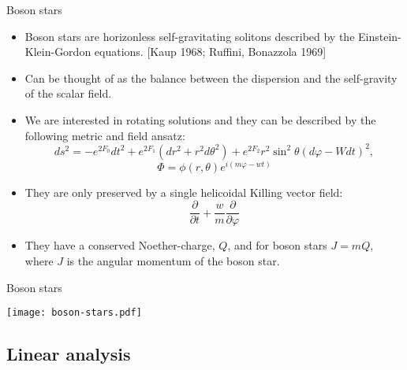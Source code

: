 \documentclass[xcolor=dvipsnames]{beamer}
\begin{document}
\begin{frame}{Boson stars}
  \begin{itemize}[<+->]
    \item Boson stars are horizonless self-gravitating solitons described by the Einstein-Klein-Gordon equations. \tiny{[Kaup 1968; Ruffini, Bonazzola 1969]}
    \item Can be thought of as the balance between the dispersion and the self-gravity of the scalar field.
    \item We are interested in rotating solutions and they can be described by the following metric and field ansatz:
      \begin{equation*}
        ds^2 = -e^{2F_0}dt^2 + e^{2F_1}\left( dr^2 + r^2d\theta^2 \right) + e^{2F_2}r^2\sin^2\theta\left( d\varphi-Wdt \right)^2, 
      \end{equation*}
      \begin{equation*}
        \Phi = \phi(r,\theta)e^{i\left( m\varphi-wt \right)}
      \end{equation*}
    \item They are only preserved by a single helicoidal Killing vector field:
      \begin{equation*}
        \frac{\partial}{\partial t} + \frac{w}{m}\frac{\partial}{\partial \varphi}
      \end{equation*}
    \item They have a conserved Noether-charge, $Q$, and for boson stars $J=mQ$, where $J$ is the angular momentum of the boson star.
  \end{itemize}
\end{frame}

\begin{frame}{Boson stars}
  \begin{center}
    \texttt{[image: boson-stars.pdf]}
  \end{center}
\end{frame}

\subsection{Linear analysis}
\begin{frame}
  \tableofcontents[currentsubsection]
\end{frame}
\end{document}
